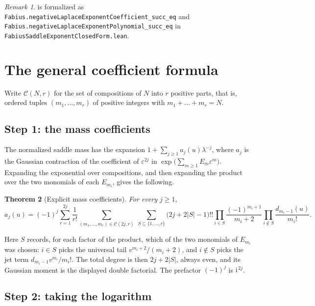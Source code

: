 \documentclass[11pt,oneside]{article}
\newtheorem{theorem}{Theorem}[section]
\theoremstyle{definition}
\theoremstyle{remark}
\newtheorem{remark}[theorem]{Remark}
\newcommand{\ii}{\mathrm i}
\begin{document}
\begin{remark}
 is formalized as
\nolinkurl{Fabius.negativeLaplaceExponentCoefficient_succ_eq}
and
\nolinkurl{Fabius.negativeLaplaceExponentPolynomial_succ_eq}
in \nolinkurl{FabiusSaddleExponentClosedForm.lean}.
\end{remark}

\section{The general coefficient formula}\label{smallarg:sec:general}

Write $\mathcal C(N,r)$ for the set of compositions of $N$ into $r$ positive
parts, that is, ordered tuples $(m_1,\dots,m_r)$ of positive integers with
$m_1+\dots+m_r=N$.

\subsection{Step 1: the mass coefficients}

The normalized saddle mass has the expansion
$1+\sum_{j\ge1}a_j(u)\lambda^{-j}$, where $a_j$ is the Gaussian contraction of
the coefficient of $\varepsilon^{2j}$ in
$\exp\bigl(\sum_{m\ge1}E_m\varepsilon^m\bigr)$.  Expanding the exponential over
compositions, and then expanding the product over the two monomials of each
$E_{m_i}$, gives the following.

\begin{theorem}[Explicit mass coefficients]\label{smallarg:thm:mass}
For every $j\ge1$,
\[
  a_j(u)=(-1)^j\sum_{r=1}^{2j}\frac1{r!}
    \sum_{(m_1,\dots,m_r)\in\mathcal C(2j,r)}\ \sum_{S\subseteq\{1,\dots,r\}}
      \bigl(2j+2|S|-1\bigr)!!
      \prod_{i\in S}\frac{(-1)^{m_i+1}}{m_i+2}
      \prod_{i\notin S}\frac{d_{m_i-1}(u)}{m_i!}.
\]
\end{theorem}

Here $S$ records, for each factor of the product, which of the two monomials of
$E_{m_i}$ was chosen: $i\in S$ picks the universal tail
$v^{m_i+2}/(m_i+2)$, and $i\notin S$ picks the jet term
$d_{m_i-1}v^{m_i}/m_i!$.  The total degree is then $2j+2|S|$, always even, and
its Gaussian moment is the displayed double factorial.  The prefactor $(-1)^j$
is $\ii^{\,2j}$.

\subsection{Step 2: taking the logarithm}
\end{document}
